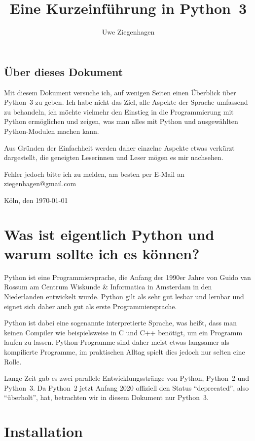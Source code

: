 \documentclass[12pt,ngerman]{scrreprt}
\title{Eine Kurzeinführung in Python~3}
\author{Uwe Ziegenhagen}
\begin{document}
\tableofcontents

\listoffigures

\listoftables

\clearpage

\section*{Über dieses Dokument}

Mit diesem Dokument versuche ich, auf wenigen Seiten einen Überblick über Python~3 zu geben. Ich habe nicht das Ziel, alle Aspekte der Sprache umfassend zu behandeln, ich möchte vielmehr den Einstieg in die Programmierung mit Python ermöglichen und zeigen, was man alles mit Python und ausgewählten Python-Modulen machen kann. 

Aus Gründen der Einfachheit werden daher einzelne Aspekte etwas verkürzt dargestellt, die geneigten Leserinnen und Leser mögen es mir nachsehen. 

Fehler jedoch bitte ich zu melden, am besten per E-Mail an ziegenhagen@gmail.com

\vspace*{3em}Köln, den \today

\chapter{Was ist eigentlich Python und warum sollte ich es können?}

Python ist eine Programmiersprache, die Anfang der 1990er Jahre von Guido van Rossum am Centrum Wiskunde \& Informatica in Amsterdam in den Niederlanden entwickelt wurde. Python gilt als sehr gut lesbar und lernbar und eignet sich daher auch gut als erste Programmiersprache. 

Python ist dabei eine sogenannte interpretierte Sprache, was heißt, dass man keinen Compiler wie beispielsweise in C und C++ benötigt, um ein Programm laufen zu lassen. Python-Programme sind daher meist etwas langsamer als kompilierte Programme, im praktischen Alltag spielt dies jedoch nur selten eine Rolle.

Lange Zeit gab es zwei parallele Entwicklungsstränge von Python, Python~2 und Python~3. Da Python~2 jetzt Anfang 2020 offiziell den Status \enquote{deprecated}, also  \enquote{überholt}, hat, betrachten wir in diesem Dokument nur Python~3.

\chapter{Installation}
\end{document}
